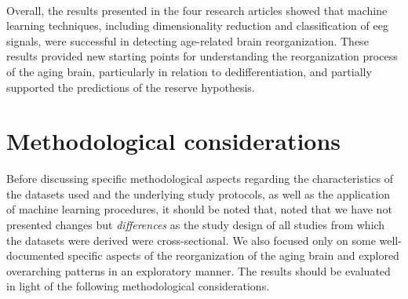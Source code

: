 \\
Overall, the results presented in the four research articles showed that machine learning techniques, including dimensionality reduction and classification of \gls{eeg} signals, were successful in detecting age-related brain reorganization. These results provided new starting points for understanding the reorganization process of the aging brain, particularly in relation to dedifferentiation, and partially supported the predictions of the reserve hypothesis.

\section{Methodological considerations}
Before discussing specific methodological aspects regarding the characteristics of the datasets used and the underlying study protocols, as well as the application of machine learning procedures, it should be noted that, noted that we have not presented changes but \textit{differences} as the study design of all studies from which the datasets were derived were cross-sectional. We also focused only on some well-documented specific aspects of the reorganization of the aging brain and explored overarching patterns in an exploratory manner. The results should be evaluated in light of the following methodological considerations. 

